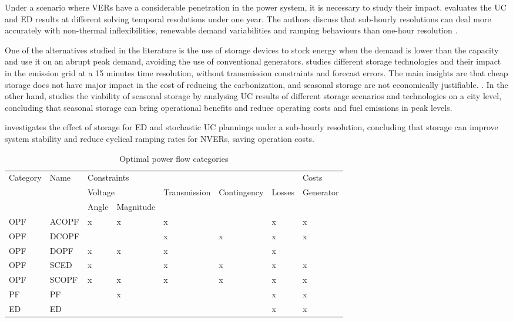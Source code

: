 \documentclass[12pt,LUDisStyle,twosided]{book}
\begin{document}
Under a scenario where VERs have a considerable penetration in the power system, it is necessary to study their impact. \citeauthor{deane} evaluates the UC and ED results at different solving temporal resolutions under one year. The authors discuss that sub-hourly resolutions can deal more accurately with non-thermal inflexibilities, renewable demand variabilities and ramping behaviours than one-hour resolution \cite{deane}. 

One of the alternatives studied in the literature is the use of storage devices to stock energy when the demand is lower than the capacity and use it on an abrupt peak demand, avoiding the use of conventional generators.\citeauthor{safaei} studies different storage technologies and their impact in the emission grid at a 15 minutes time resolution, without transmission constraints and forecast errors. The main insights are that cheap storage does not have major impact in the cost of reducing the carbonization, and seasonal storage are not economically justifiable. \cite{safaei}. In the other hand, \citeauthor{harris} studies the viability of seasonal storage by analysing UC results of different storage scenarios and technologies on a city level, concluding that seasonal storage can bring operational benefits and reduce operating costs and fuel emissions in peak levels.
 
\citeauthor{dwyer} investigates the effect of storage for ED and stochastic UC plannings under a sub-hourly resolution, concluding that storage can improve system stability and reduce cyclical ramping rates for NVERs, saving operation costs. 


\begin{table}[h]
\centering
\caption{Optimal power flow categories \cite{cain}}
\label{table:PowerSystemsCat}
\begin{tabular}{|l|l|l|l|l|l|l|l|}
\hline
\multirow{3}{*}{Category} & \multirow{3}{*}{Name} & \multicolumn{5}{l|}{Constraints} & Costs \\ \cline{3-8} 
 &  & \multicolumn{2}{l|}{Voltage} & \multirow{2}{*}{Transmission} & \multirow{2}{*}{Contingency} & \multirow{2}{*}{Losses} & \multirow{2}{*}{Generator} \\ \cline{3-4}
 &  & Angle & Magnitude &  &  &  &  \\ \hline
OPF & ACOPF & x & x & x &  & x & x \\ \hline
OPF & DCOPF &  &  & x & x & x & x \\ \hline
OPF & DOPF & x & x & x &  & x &  \\ \hline
OPF & SCED & x &  & x & x & x & x \\ \hline
OPF & SCOPF & x & x & x & x & x & x \\ \hline
PF & PF &  & x &  &  & x & x \\ \hline
ED & ED &  &  &  &  & x & x \\ \hline
\end{tabular}
\end{table}
\end{document}

